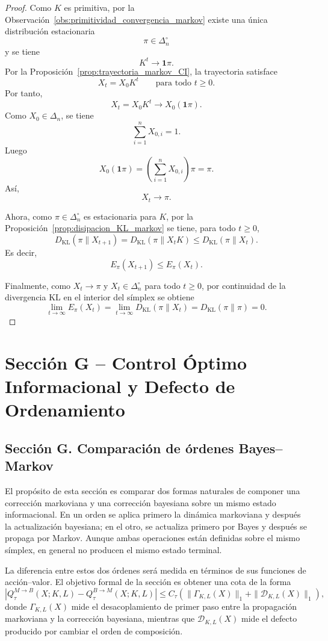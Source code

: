 ﻿\documentclass[12pt]{article}
\begin{document}
\begin{proof}
Como \(K\) es primitiva, por la Observación~\ref{obs:primitividad_convergencia_markov} existe una única distribución estacionaria
\[
\pi\in\Delta_n^\circ
\]
y se tiene
\[
K^t\longrightarrow \mathbf 1\pi.
\]
Por la Proposición~\ref{prop:trayectoria_markov_CI}, la trayectoria satisface
\[
X_t=X_0K^t
\qquad
\text{para todo }t\ge 0.
\]
Por tanto,
\[
X_t=X_0K^t\longrightarrow X_0(\mathbf 1\pi).
\]
Como \(X_0\in\Delta_n\), se tiene
\[
\sum_{i=1}^n X_{0,i}=1.
\]
Luego
\[
X_0(\mathbf 1\pi)
=
\left(\sum_{i=1}^n X_{0,i}\right)\pi
=
\pi.
\]
Así,
\[
X_t\longrightarrow \pi.
\]

Ahora, como \(\pi\in\Delta_n^\circ\) es estacionaria para \(K\), por la Proposición~\ref{prop:disipacion_KL_markov} se tiene, para todo \(t\ge 0\),
\[
D_{\mathrm{KL}}(\pi\|X_{t+1})
=
D_{\mathrm{KL}}(\pi\|X_tK)
\le
D_{\mathrm{KL}}(\pi\|X_t).
\]
Es decir,
\[
E_\pi(X_{t+1})\le E_\pi(X_t).
\]

Finalmente, como \(X_t\to\pi\) y \(X_t\in\Delta_n^\circ\) para todo \(t\ge 0\), por continuidad de la divergencia KL en el interior del símplex se obtiene
\[
\lim_{t\to\infty}E_\pi(X_t)
=
\lim_{t\to\infty}D_{\mathrm{KL}}(\pi\|X_t)
=
D_{\mathrm{KL}}(\pi\|\pi)
=
0.
\]
\end{proof}

\clearpage


\section{Sección G -- Control Óptimo Informacional y Defecto de Ordenamiento}

\subsection*{Sección G. Comparación de órdenes Bayes--Markov}

El propósito de esta sección es comparar dos formas naturales de componer una corrección markoviana y una corrección bayesiana sobre un mismo estado informacional. En un orden se aplica primero la dinámica markoviana y después la actualización bayesiana; en el otro, se actualiza primero por Bayes y después se propaga por Markov. Aunque ambas operaciones están definidas sobre el mismo símplex, en general no producen el mismo estado terminal.

La diferencia entre estos dos órdenes será medida en términos de sus funciones de acción--valor. El objetivo formal de la sección es obtener una cota de la forma
\[
\left|
Q_\tau^{M\to B}(X;K,L)-Q_\tau^{B\to M}(X;K,L)
\right|
\le
C_\tau\left(
\|\Gamma_{K,L}(X)\|_1+
\|\mathcal D_{K,L}(X)\|_1
\right),
\]
donde \(\Gamma_{K,L}(X)\) mide el desacoplamiento de primer paso entre la propagación markoviana y la corrección bayesiana, mientras que \(\mathcal D_{K,L}(X)\) mide el defecto producido por cambiar el orden de composición.
\end{document}
